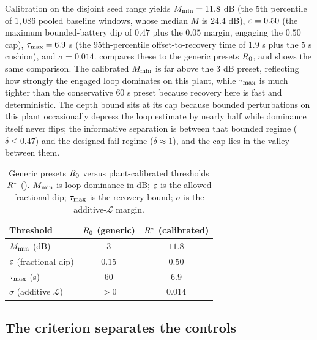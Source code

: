 \documentclass[11pt]{article}
\begin{document}
Calibration on the disjoint seed range yields $M_{\min} = 11.8$ dB (the 5th percentile of $1{,}086$ pooled baseline windows, whose median $M$ is $24.4$ dB), $\varepsilon = 0.50$ (the maximum bounded-battery dip of $0.47$ plus the $0.05$ margin, engaging the $0.50$ cap), $\tau_{\max} = 6.9$ s (the 95th-percentile offset-to-recovery time of $1.9$ s plus the $5$ s cushion), and $\sigma = 0.014$.  compares these to the generic presets $R_0$, and  shows the same comparison. The calibrated $M_{\min}$ is far above the $3$ dB preset, reflecting how strongly the engaged loop dominates on this plant, while $\tau_{\max}$ is much tighter than the conservative $60$ s preset because recovery here is fast and deterministic. The depth bound sits at its cap because bounded perturbations on this plant occasionally depress the loop estimate by nearly half while dominance itself never flips; the informative separation is between that bounded regime ($\delta \leq 0.47$) and the designed-fail regime ($\delta \approx 1$), and the cap lies in the valley between them.

\begin{table}[ht]
\centering
\caption{Generic presets $R_0$ versus plant-calibrated thresholds $R^*$ (). $M_{\min}$ is loop dominance in dB; $\varepsilon$ is the allowed fractional dip; $\tau_{\max}$ is the recovery bound; $\sigma$ is the additive-$\mathcal{L}$ margin.}
\label{tab:calibration}
\small
\begin{tabular}{lcc}
\toprule
\textbf{Threshold} & \textbf{$R_0$ (generic)} & \textbf{$R^*$ (calibrated)} \\
\midrule
$M_{\min}$ (dB) & $3$ & $11.8$ \\
$\varepsilon$ (fractional dip) & $0.15$ & $0.50$ \\
$\tau_{\max}$ (s) & $60$ & $6.9$ \\
$\sigma$ (additive $\mathcal{L}$) & $>0$ & $0.014$ \\
\bottomrule
\end{tabular}
\end{table}


\subsection{The criterion separates the controls}
\label{sec:results_battery}
\end{document}
